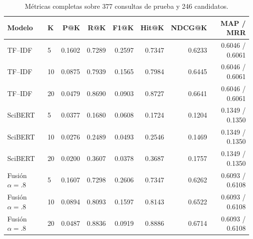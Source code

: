 \documentclass[12pt,a4paper]{article}
\begin{document}
\begin{table}[htbp]
\centering
\caption{Métricas completas sobre 377 consultas de prueba y 246 candidatos.}
\label{tab:metricas}
\scriptsize
\begin{tabular}{llrrrrrr}
\toprule
Modelo & K & P@K & R@K & F1@K & Hit@K & NDCG@K & MAP / MRR \\
\midrule
TF--IDF & 5  & 0.1602 & 0.7289 & 0.2597 & 0.7347 & 0.6233 & 0.6046 / 0.6061 \\
TF--IDF & 10 & 0.0875 & 0.7939 & 0.1565 & 0.7984 & 0.6445 & 0.6046 / 0.6061 \\
TF--IDF & 20 & 0.0479 & 0.8690 & 0.0903 & 0.8727 & 0.6641 & 0.6046 / 0.6061 \\
SciBERT & 5  & 0.0377 & 0.1680 & 0.0608 & 0.1724 & 0.1204 & 0.1349 / 0.1350 \\
SciBERT & 10 & 0.0276 & 0.2489 & 0.0493 & 0.2546 & 0.1469 & 0.1349 / 0.1350 \\
SciBERT & 20 & 0.0200 & 0.3607 & 0.0378 & 0.3687 & 0.1757 & 0.1349 / 0.1350 \\
Fusión $\alpha=.8$ & 5  & 0.1607 & 0.7298 & 0.2606 & 0.7347 & 0.6262 & 0.6093 / 0.6108 \\
Fusión $\alpha=.8$ & 10 & 0.0894 & 0.8093 & 0.1597 & 0.8143 & 0.6522 & 0.6093 / 0.6108 \\
Fusión $\alpha=.8$ & 20 & 0.0487 & 0.8836 & 0.0919 & 0.8886 & 0.6714 & 0.6093 / 0.6108 \\
\bottomrule
\end{tabular}
\end{table}
\end{document}
